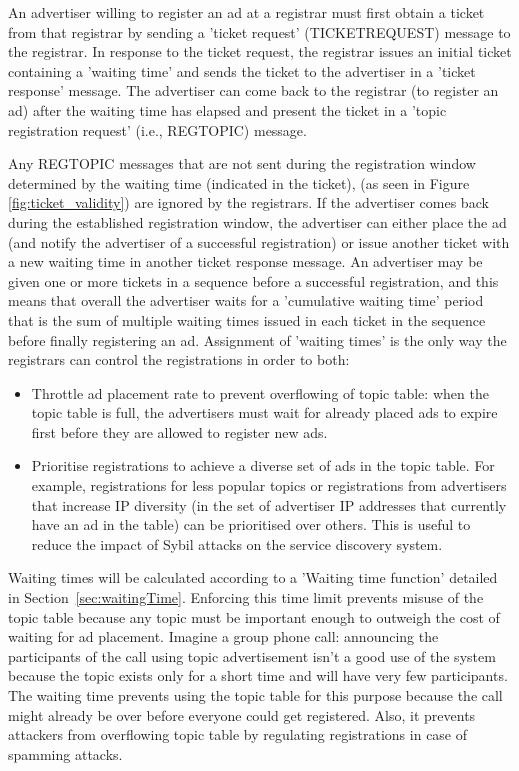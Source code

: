 An advertiser willing to register an ad at a registrar must first obtain a ticket from that registrar by sending a 'ticket request' (TICKETREQUEST) message to the registrar. In response to the ticket request, the registrar issues an initial ticket containing a 'waiting time' and sends the ticket to the advertiser in a 'ticket response' message. The advertiser can come back to the registrar (to register an ad) after the waiting time has elapsed and present the ticket in a 'topic registration request' (i.e., REGTOPIC) message.

Any REGTOPIC messages that are not sent during the registration window determined by the waiting time (indicated in the ticket),   (as seen in Figure \ref{fig:ticket_validity}) are ignored by the registrars.  
If the advertiser comes back during the established registration window,  the advertiser can either place the ad (and notify the advertiser of a successful registration) or issue another ticket with a new waiting time in another ticket response message. 
An advertiser may be given one or more tickets in a sequence before a successful registration,  and this means that overall the advertiser waits for a 'cumulative waiting time' period that is the sum of multiple waiting times issued in each ticket in the sequence before finally registering an ad. 
Assignment of 'waiting times' is the only way the registrars can control the registrations in order to both:

\begin{itemize}
    \item Throttle ad placement rate to prevent overflowing of topic table: when the topic table is full, the advertisers must wait for already placed ads to expire first before they are allowed to register new ads.
    \item Prioritise registrations to achieve a diverse set of ads in the topic table. For example, registrations for less popular topics or registrations from advertisers that increase IP diversity (in the set of advertiser IP addresses that currently have an ad in the table) can be prioritised over others. This is useful to reduce the impact of Sybil attacks on the service discovery system.
\end{itemize}

Waiting times will be calculated according to a 'Waiting time function' detailed in Section~\ref{sec:waitingTime}.  Enforcing this time limit prevents misuse of the topic table because any topic must be important enough to outweigh the cost of waiting for ad placement. Imagine a group phone call: announcing the participants of the call using topic advertisement isn't a good use of the system because the topic exists only for a short time and will have very few participants. The waiting time prevents using the topic table for this purpose because the call might already be over before everyone could get registered. Also, it prevents attackers from overflowing topic table by regulating registrations in case of spamming attacks.

